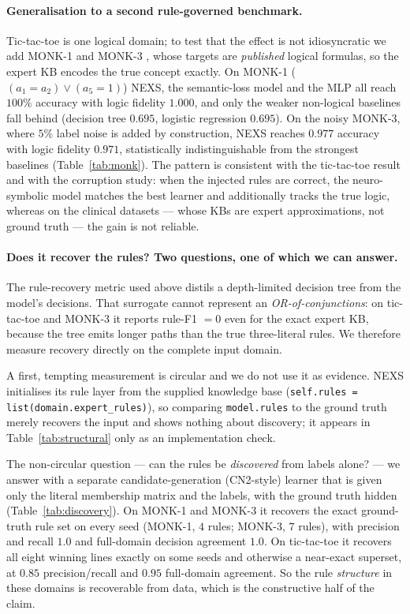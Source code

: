 \documentclass[11pt]{article}
\newcommand{\nexs}{\textsc{NEXS}}
\begin{document}
\paragraph{Generalisation to a second rule-governed benchmark.}
Tic-tac-toe is one logical domain; to test that the effect is not idiosyncratic
we add MONK-1 and MONK-3 \cite{thrun1991monk}, whose targets are \emph{published}
logical formulas, so the expert KB encodes the true concept exactly. On MONK-1
($(a_1{=}a_2)\lor(a_5{=}1)$) \nexs{}, the semantic-loss model and the MLP all
reach $100\%$ accuracy with logic fidelity $1.000$, and only the weaker
non-logical baselines fall behind (decision tree $0.695$, logistic regression
$0.695$). On the noisy MONK-3, where $5\%$ label noise is added by construction,
\nexs{} reaches $0.977$ accuracy with logic fidelity $0.971$, statistically
indistinguishable from the strongest baselines (Table~\ref{tab:monk}). The
pattern is consistent with the tic-tac-toe result and with the corruption study:
when the injected rules are correct, the neuro-symbolic model matches the best
learner and additionally tracks the true logic, whereas on the clinical datasets
--- whose KBs are expert approximations, not ground truth --- the gain is not
reliable.

\paragraph{Does it recover the rules? Two questions, one of which we can answer.}
The rule-recovery metric used above distils a depth-limited decision tree from
the model's decisions. That surrogate cannot represent an
\emph{OR-of-conjunctions}: on tic-tac-toe and MONK-3 it reports rule-F1 $=0$ even
for the exact expert KB, because the tree emits longer paths than the true
three-literal rules. We therefore measure recovery directly on the complete
input domain.

A first, tempting measurement is circular and we do not use it as evidence.
\nexs{} initialises its rule layer from the supplied knowledge base
(\texttt{self.rules = list(domain.expert\_rules)}), so comparing
\texttt{model.rules} to the ground truth merely recovers the input and shows
nothing about discovery; it appears in Table~\ref{tab:structural} only as an
implementation check.

The non-circular question --- can the rules be \emph{discovered} from labels
alone? --- we answer with a separate candidate-generation (CN2-style) learner
that is given only the literal membership matrix and the labels, with the
ground truth hidden (Table~\ref{tab:discovery}). On MONK-1 and MONK-3 it
recovers the exact ground-truth rule set on every seed (MONK-1, $4$ rules;
MONK-3, $7$ rules), with precision and recall $1.0$ and full-domain decision
agreement $1.0$. On tic-tac-toe it recovers all eight winning lines exactly on
some seeds and otherwise a near-exact superset, at $0.85$ precision/recall and
$0.95$ full-domain agreement. So the rule \emph{structure} in these domains is
recoverable from data, which is the constructive half of the claim.
\end{document}
